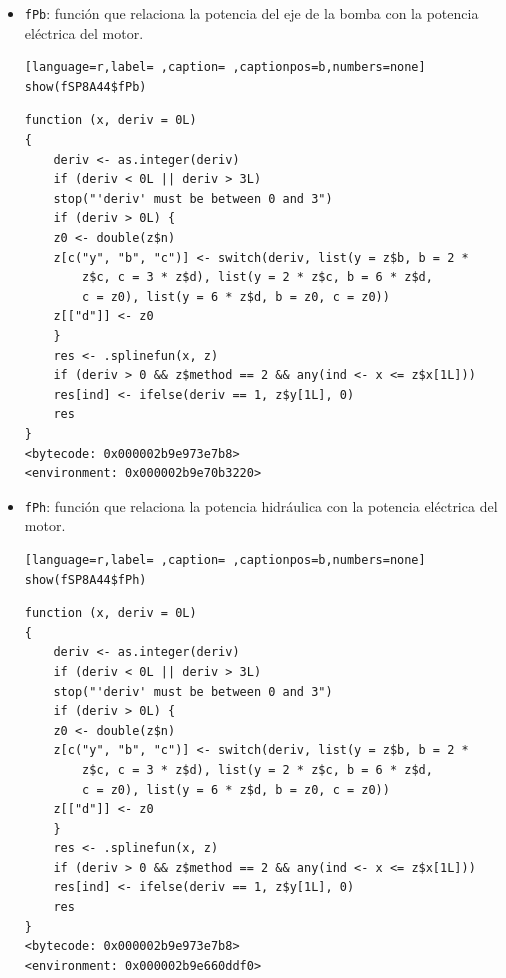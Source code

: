 \begin{itemize}
\begin{itemize}
\begin{verbatim}
function (x, deriv = 0L) 
{
    deriv <- as.integer(deriv)
    if (deriv < 0L || deriv > 3L) 
	stop("'deriv' must be between 0 and 3")
    if (deriv > 0L) {
	z0 <- double(z$n)
	z[c("y", "b", "c")] <- switch(deriv, list(y = z$b, b = 2 * 
	    z$c, c = 3 * z$d), list(y = 2 * z$c, b = 6 * z$d, 
	    c = z0), list(y = 6 * z$d, b = z0, c = z0))
	z[["d"]] <- z0
    }
    res <- .splinefun(x, z)
    if (deriv > 0 && z$method == 2 && any(ind <- x <= z$x[1L])) 
	res[ind] <- ifelse(deriv == 1, z$y[1L], 0)
    res
}
<bytecode: 0x000002b9e973e7b8>
<environment: 0x000002b9e725bd18>
\end{verbatim}

\item \texttt{fPb}: función que relaciona la potencia del eje de la bomba con la potencia eléctrica del motor.
\begin{lstlisting}[language=r,label= ,caption= ,captionpos=b,numbers=none]
show(fSP8A44$fPb)
\end{lstlisting}

\begin{verbatim}
function (x, deriv = 0L) 
{
    deriv <- as.integer(deriv)
    if (deriv < 0L || deriv > 3L) 
	stop("'deriv' must be between 0 and 3")
    if (deriv > 0L) {
	z0 <- double(z$n)
	z[c("y", "b", "c")] <- switch(deriv, list(y = z$b, b = 2 * 
	    z$c, c = 3 * z$d), list(y = 2 * z$c, b = 6 * z$d, 
	    c = z0), list(y = 6 * z$d, b = z0, c = z0))
	z[["d"]] <- z0
    }
    res <- .splinefun(x, z)
    if (deriv > 0 && z$method == 2 && any(ind <- x <= z$x[1L])) 
	res[ind] <- ifelse(deriv == 1, z$y[1L], 0)
    res
}
<bytecode: 0x000002b9e973e7b8>
<environment: 0x000002b9e70b3220>
\end{verbatim}

\item \texttt{fPh}: función que relaciona la potencia hidráulica con la potencia eléctrica del motor.
\begin{lstlisting}[language=r,label= ,caption= ,captionpos=b,numbers=none]
show(fSP8A44$fPh)
\end{lstlisting}

\begin{verbatim}
function (x, deriv = 0L) 
{
    deriv <- as.integer(deriv)
    if (deriv < 0L || deriv > 3L) 
	stop("'deriv' must be between 0 and 3")
    if (deriv > 0L) {
	z0 <- double(z$n)
	z[c("y", "b", "c")] <- switch(deriv, list(y = z$b, b = 2 * 
	    z$c, c = 3 * z$d), list(y = 2 * z$c, b = 6 * z$d, 
	    c = z0), list(y = 6 * z$d, b = z0, c = z0))
	z[["d"]] <- z0
    }
    res <- .splinefun(x, z)
    if (deriv > 0 && z$method == 2 && any(ind <- x <= z$x[1L])) 
	res[ind] <- ifelse(deriv == 1, z$y[1L], 0)
    res
}
<bytecode: 0x000002b9e973e7b8>
<environment: 0x000002b9e660ddf0>
\end{verbatim}


\end{itemize}
\end{itemize}
